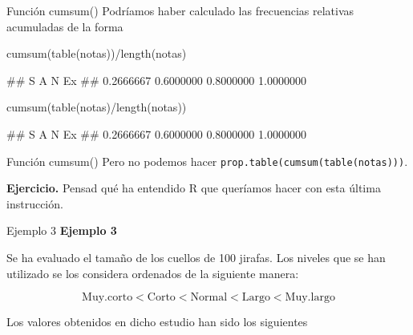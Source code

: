 \documentclass[
  ignorenonframetext,
  aspectratio=169]{beamer}
\newenvironment{Shaded}{\begin{snugshade}}{\end{snugshade}}
\newcommand{\FunctionTok}[1]{\textcolor[rgb]{0.00,0.00,0.00}{#1}}
\newcommand{\NormalTok}[1]{#1}
\newcommand{\SpecialCharTok}[1]{\textcolor[rgb]{0.00,0.00,0.00}{#1}}
\let\oldverbatim\verbatim
\let\endoldverbatim\endverbatim
\renewenvironment{verbatim}{\tiny\oldverbatim}{\endoldverbatim}
\begin{document}
\begin{frame}[fragile]{Función cumsum()}
\protect\hypertarget{funciuxf3n-cumsum-3}{}
Podríamos haber calculado las frecuencias relativas acumuladas de la
forma

\begin{Shaded}
\begin{Highlighting}[]
\FunctionTok{cumsum}\NormalTok{(}\FunctionTok{table}\NormalTok{(notas))}\SpecialCharTok{/}\FunctionTok{length}\NormalTok{(notas)}
\end{Highlighting}
\end{Shaded}

\begin{verbatim}
##         S         A         N        Ex 
## 0.2666667 0.6000000 0.8000000 1.0000000
\end{verbatim}

\begin{Shaded}
\begin{Highlighting}[]
\FunctionTok{cumsum}\NormalTok{(}\FunctionTok{table}\NormalTok{(notas)}\SpecialCharTok{/}\FunctionTok{length}\NormalTok{(notas))}
\end{Highlighting}
\end{Shaded}

\begin{verbatim}
##         S         A         N        Ex 
## 0.2666667 0.6000000 0.8000000 1.0000000
\end{verbatim}
\end{frame}

\begin{frame}[fragile]{Función cumsum()}
\protect\hypertarget{funciuxf3n-cumsum-4}{}
Pero no podemos hacer \texttt{prop.table(cumsum(table(notas)))}.

\textbf{Ejercicio.} Pensad qué ha entendido R que queríamos hacer con
esta última instrucción.
\end{frame}

\begin{frame}{Ejemplo 3}
\protect\hypertarget{ejemplo-3}{}
\textbf{Ejemplo 3}

Se ha evaluado el tamaño de los cuellos de 100 jirafas. Los niveles que
se han utilizado se los considera ordenados de la siguiente manera:

\[\text{Muy.corto}<\text{Corto}<\text{Normal}<\text{Largo}<\text{Muy.largo}\]

Los valores obtenidos en dicho estudio han sido los siguientes
\end{frame}
\end{document}
